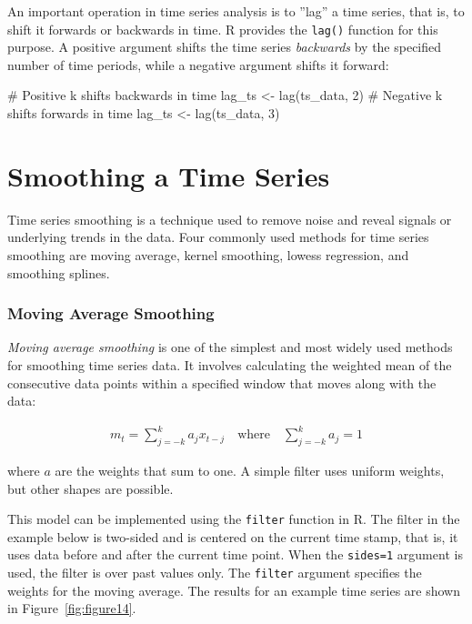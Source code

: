 An important operation in time series analysis is to ''lag'' a time series, that is, to shift it forwards or backwards in time. R provides the \texttt{lag()} function for this purpose. A positive argument shifts the time series \emph{backwards} by the specified number of time periods, while a negative argument shifts it forward:

\begin{samepage}
\begin{Rcode}
# Positive k shifts backwards in time
lag_ts <- lag(ts_data, 2)
# Negative k shifts forwards in time
lag_ts <- lag(ts_data, 3)
\end{Rcode}
\end{samepage}

\section{Smoothing a Time Series}

Time series smoothing is a technique used to remove noise and reveal signals or underlying trends in the data. Four commonly used methods for time series smoothing are moving average, kernel smoothing, lowess regression, and smoothing splines. 

\subsubsection*{Moving Average Smoothing}

\emph{Moving average smoothing} is one of the simplest and most widely used methods for smoothing time series data. It involves calculating the weighted mean of the consecutive data points within a specified window that moves along with the data:

\begin{align*}m_t = \sum_{j=-k}^k a_j x_{t-j} \quad \text{where} \quad
\sum_{j=-k}^k a_j = 1
\end{align*}

\noindent where $a$ are the weights that sum to one. A simple filter uses uniform weights, but other shapes are possible.

This model can be implemented using the \texttt{filter} function in R. The filter in the example below is two-sided and is centered on the current time stamp, that is, it uses data before and after the current time point. When the \texttt{sides=1} argument is used, the filter is over past values only. The \texttt{filter} argument specifies the weights for the moving average. The results for an example time series are shown in Figure~\ref{fig:figure14}.

